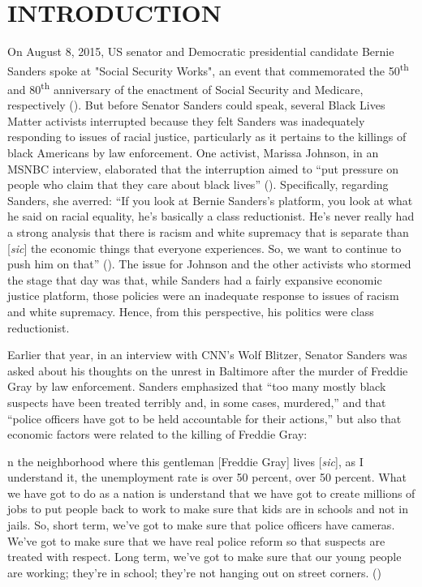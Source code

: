 \documentclass[12pt]{article}
\renewenvironment{quote}
  {\list{}{\leftmargin=\parindent\rightmargin=0pt}%
   \item\relax}
  {\endlist}
\begin{document}

\section{INTRODUCTION}

On August 8, 2015, US senator and Democratic presidential candidate Bernie Sanders spoke at "Social Security Works", an event that commemorated the 50\textsuperscript{th} and 80\textsuperscript{th} anniversary of the enactment of Social Security and Medicare, respectively (\cite{wilsonProtestersShutBernie2015}). But before Senator Sanders could speak, several Black Lives Matter activists interrupted because they felt Sanders was inadequately responding to issues of racial justice, particularly as it pertains to the killings of black Americans by law enforcement. One activist, Marissa Johnson, in an MSNBC interview, elaborated that the interruption aimed to “put pressure on people who claim that they care about black lives” (\cite{hallBernieSandersBlack2015}). Specifically, regarding Sanders, she averred: “If you look at Bernie Sanders’s platform, you look at what he said on racial equality, he’s basically a class reductionist. He’s never really had a strong analysis that there is racism and white supremacy that is separate than [\textit{sic}] the economic things that everyone experiences. So, we want to continue to push him on that” (\cite{hallBernieSandersBlack2015}). The issue for Johnson and the other activists who stormed the stage that day was that, while Sanders had a fairly expansive economic justice platform, those policies were an inadequate response to issues of racism and white supremacy. Hence, from this perspective, his politics were class reductionist.

Earlier that year, in an interview with CNN’s Wolf Blitzer, Senator Sanders was asked about his thoughts on the unrest in Baltimore after the murder of Freddie Gray by law enforcement. Sanders emphasized that “too many mostly black suspects have been treated terribly and, in some cases, murdered,” and that “police officers have got to be held accountable for their actions,” but also that economic factors were related to the killing of Freddie Gray:

\begin{quote}
[I]n the neighborhood where this gentleman [Freddie Gray] lives [\textit{sic}], as I understand it, the unemployment rate is over 50 percent, over 50 percent. What we have got to do as a nation is understand that we have got to create millions of jobs to put people back to work to make sure that kids are in schools and not in jails. So, short term, we've got to make sure that police officers have cameras. We've got to make sure that we have real police reform so that suspects are treated with respect. Long term, we've got to make sure that our young people are working; they're in school; they're not hanging out on street corners. (\cite{sandersInterviewWolfBlitzer2015})
\end{quote}
\end{document}
